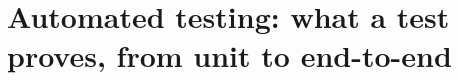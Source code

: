 \chapter{Automated testing: what a test proves, from unit to end-to-end}
\label{ch:automated-testing-what-a-test-proves}

